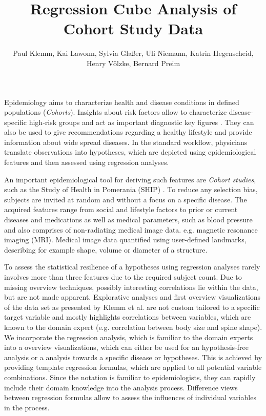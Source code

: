 \documentclass[journal]{style/vgtc} 			          %
\title{Regression Cube Analysis of Cohort Study Data}
\author{Paul Klemm, Kai Lawonn, Sylvia Gla{\ss}er, Uli Niemann, Katrin Hegenscheid, Henry V{\"o}lzke, Bernard Preim}
\begin{document}


\maketitle
Epidemiology aims to characterize health and disease conditions in defined populations (\emph{Cohorts}).
Insights about risk factors allow to characterize disease-specific high-risk groups and act as important diagnostic key figures \cite{Fletcher2012}.
They can also be used to give recommendations regarding a healthy lifestyle and provide information about wide spread diseases.
In the standard workflow, physicians translate observations into hypotheses, which are depicted using epidemiological features and then assessed using regression analyses.

An important epidemiological tool for deriving such features are \emph{Cohort studies}, such as the Study of Health in Pomerania (SHIP) \cite{Volzke2011}.
To reduce any selection bias, subjects are invited at random and without a focus on a specific disease.
The acquired features range from social and lifestyle factors to prior or current diseases and medications as well as medical parameters, such as blood pressure and also comprises of non-radiating medical image data. e.g. magnetic resonance imaging (MRI).
Medical image data quantified using user-defined landmarks, describing for example shape, volume or diameter of a structure.

To assess the statistical resilience of a hypotheses using regression analyses rarely involves more than three features due to the required subject count.
Due to missing overview techniques, possibly interesting correlations lie within the data, but are not made apparent.
Explorative analyses and first overview visualizations of the data set as presented by Klemm et al. \cite{Klemm2014VIS} are not custom tailored to a specific target variable and mostly highlights correlations between variables, which are known to the domain expert (e.g. correlation between body size and spine shape).
We incorporate the regression analysis, which is familiar to the domain experts into a overview visualizations, which can either be used for an hypothesis-free analysis or a analysis towards a specific disease or hypotheses.
This is achieved by providing template regression formulas, which are applied to all potential variable combinations.
Since the notation is familiar to epidemiologists, they can rapidly include their domain knowledge into the analysis process.
Difference views between regression formulas allow to assess the influences of individual variables in the process.
\end{document}
